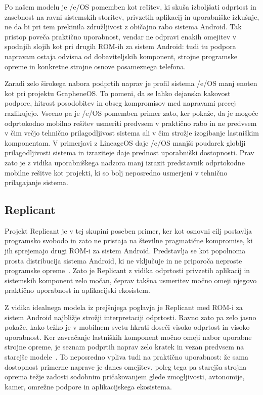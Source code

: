 \documentclass[a4paper,12pt,openright]{book}
\begin{document}
Po našem modelu je /e/OS pomemben kot rešitev, ki skuša izboljšati odprtost in zasebnost na ravni sistemskih storitev, privzetih aplikacij in uporabniške izkušnje, ne da bi pri tem prekinila združljivost z običajno rabo sistema Android.
Tak pristop poveča praktično uporabnost, vendar ne odpravi enakih omejitev v spodnjih slojih kot pri drugih ROM-ih za sistem Android:
tudi tu podpora napravam ostaja odvisna od dobaviteljskih komponent, strojne programske opreme in konkretne strojne osnove posameznega telefona.

Zaradi zelo širokega nabora podprtih naprav je profil sistema /e/OS manj enoten kot pri projektu GrapheneOS.
To pomeni, da se lahko dejanska kakovost podpore, hitrost posodobitev in obseg kompromisov med napravami precej razlikujejo.
Vseeno pa je /e/OS pomemben primer zato, ker pokaže, da je mogoče odprtokodno mobilno rešitev usmeriti predvsem v praktično rabo in ne predvsem v čim večjo tehnično prilagodljivost sistema ali v čim strožje izogibanje lastniškim komponentam.
V primerjavi z LineageOS daje /e/OS manjši poudarek globlji prilagodljivosti sistema in izraziteje daje prednost uporabniški dostopnosti.
Prav zato je z vidika uporabniškega nadzora manj izrazit predstavnik odprtokodne mobilne rešitve kot projekti, ki so bolj neposredno usmerjeni v tehnično prilagajanje sistema.

\subsection{Replicant}

Projekt Replicant je v tej skupini poseben primer, ker kot osnovni cilj postavlja programsko svobodo in zato ne pristaja na številne pragmatične kompromise, ki jih sprejemajo drugi ROM-i za sistem Android.
Predstavlja se kot popolnoma prosta distribucija sistema Android, ki ne vključuje in ne priporoča neproste programske opreme~\cite{replicant_about}.
Zato je Replicant z vidika odprtosti privzetih aplikacij in sistemskih komponent zelo močan, čeprav takšna usmeritev močno omeji njegovo praktično uporabnost in aplikacijski ekosistem.

Z vidika idealnega modela iz prejšnjega poglavja je Replicant med ROM-i za sistem Android najbližje strožji interpretaciji odprtosti.
Ravno zato pa zelo jasno pokaže, kako težko je v mobilnem svetu hkrati doseči visoko odprtost in visoko uporabnost.
Ker zavračanje lastniških komponent močno omeji nabor uporabne strojne opreme, je seznam podprtih naprav zelo kratek in vezan predvsem na starejše modele~\cite{replicant_supported_devices}.
To neposredno vpliva tudi na praktično uporabnost:
že sama dostopnost primerne naprave je danes omejitev, poleg tega pa starejša strojna oprema težje zadosti sodobnim pričakovanjem glede zmogljivosti, avtonomije, kamer, omrežne podpore in aplikacijskega ekosistema.
\end{document}
